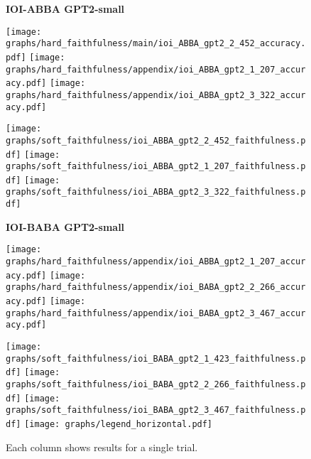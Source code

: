 \begin{figure*}
    \centering
    \textbf{IOI-ABBA GPT2-small}


    \texttt{[image: graphs/hard\_faithfulness/main/ioi\_ABBA\_gpt2\_2\_452\_accuracy.pdf]} \hfill 
    \texttt{[image: graphs/hard\_faithfulness/appendix/ioi\_ABBA\_gpt2\_1\_207\_accuracy.pdf]} \hfill 
    \texttt{[image: graphs/hard\_faithfulness/appendix/ioi\_ABBA\_gpt2\_3\_322\_accuracy.pdf]} \hfill 

    
    \vspace{0.05cm}
    \texttt{[image: graphs/soft\_faithfulness/ioi\_ABBA\_gpt2\_2\_452\_faithfulness.pdf]} \hfill 
    \texttt{[image: graphs/soft\_faithfulness/ioi\_ABBA\_gpt2\_1\_207\_faithfulness.pdf]} \hfill 
    \texttt{[image: graphs/soft\_faithfulness/ioi\_ABBA\_gpt2\_3\_322\_faithfulness.pdf]} \hfill 


     \textbf{IOI-BABA GPT2-small}


    \texttt{[image: graphs/hard\_faithfulness/appendix/ioi\_ABBA\_gpt2\_1\_207\_accuracy.pdf]} \hfill 
    \texttt{[image: graphs/hard\_faithfulness/appendix/ioi\_BABA\_gpt2\_2\_266\_accuracy.pdf]} \hfill 
    \texttt{[image: graphs/hard\_faithfulness/appendix/ioi\_BABA\_gpt2\_3\_467\_accuracy.pdf]} \hfill 

    
    \vspace{0.05cm}
    \texttt{[image: graphs/soft\_faithfulness/ioi\_BABA\_gpt2\_1\_423\_faithfulness.pdf]} \hfill 
    \texttt{[image: graphs/soft\_faithfulness/ioi\_BABA\_gpt2\_2\_266\_faithfulness.pdf]} \hfill 
    \texttt{[image: graphs/soft\_faithfulness/ioi\_BABA\_gpt2\_3\_467\_faithfulness.pdf]} \hfill 
    \vspace{0.05cm}
    \texttt{[image: graphs/legend\_horizontal.pdf]} \hfill
\caption{Each column shows results for a single trial.}
\label{fig:faithfulness_all_ioi_gpt2}
\end{figure*}


